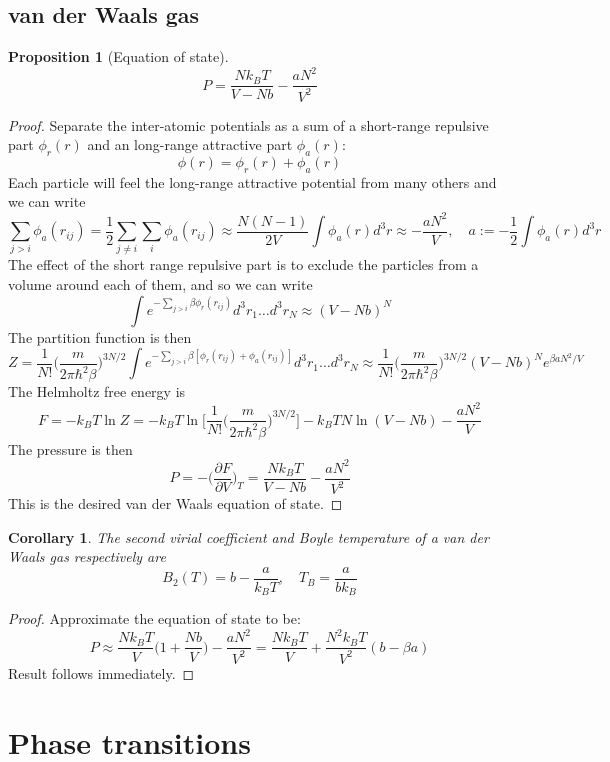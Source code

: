 \documentclass[a4paper]{article}
\theoremstyle{new}
\newtheorem{prop}{Proposition}[section]
\newtheorem{cor}{Corollary}[section]
\begin{document}
\subsection{van der Waals gas}
\begin{prop}[Equation of state]
$$P=\frac{Nk_BT}{V-Nb}-\frac{aN^2}{V^2}$$
\end{prop}
\begin{proof}
Separate the inter-atomic potentials as a sum of a short-range repulsive part $\phi_r(r)$ and an long-range attractive part $\phi_a(r)$:
$$\phi(r)=\phi_r(r)+\phi_a(r)$$
Each particle will feel the long-range attractive potential from many others and we can write
$$\sum_{j>i}\phi_a(r_{ij})=\frac{1}{2}\sum_{j\neq i}\sum_i\phi_a(r_{ij})\approx\frac{N(N-1)}{2V}\int\phi_a(r)d^3r\approx-\frac{aN^2}{V},\quad a:=-\frac{1}{2}\int\phi_a(r)d^3r$$
The effect of the short range repulsive part is to exclude the particles from a volume around each of them, and so we can write
$$\int e^{-\sum_{j>i}\beta\phi_r(r_{ij})}d^3r_1\dots d^3r_N\approx (V-Nb)^N$$
The partition function is then
$$Z=\frac{1}{N!}\bigg(\frac{m}{2\pi\hbar^2\beta}\bigg)^{3N/2}\int e^{-\sum_{j>i}\beta[\phi_r(r_{ij})+\phi_a(r_{ij})]}d^3r_1\dots d^3r_N\approx\frac{1}{N!}\bigg(\frac{m}{2\pi\hbar^2\beta}\bigg)^{3N/2}(V-Nb)^Ne^{\beta aN^2/V}$$
The Helmholtz free energy is
$$F=-k_BT\ln Z=-k_BT\ln\bigg[\frac{1}{N!}\bigg(\frac{m}{2\pi\hbar^2\beta}\bigg)^{3N/2}\bigg]-k_BTN\ln(V-Nb)-\frac{aN^2}{V}$$
The pressure is then
$$P=-\bigg(\frac{\partial F}{\partial V}\bigg)_T=\frac{Nk_BT}{V-Nb}-\frac{aN^2}{V^2}$$
This is the desired van der Waals equation of state.
\end{proof}
\begin{cor}
The second virial coefficient and Boyle temperature of a van der Waals gas respectively are
$$B_2(T)=b-\frac{a}{k_BT},\quad T_B=\frac{a}{bk_B}$$
\end{cor}
\begin{proof}
Approximate the equation of state to be:
$$P\approx\frac{Nk_BT}{V}\bigg(1+\frac{Nb}{V}\bigg)-\frac{aN^2}{V^2}=\frac{Nk_BT}{V}+\frac{N^2k_BT}{V^2}(b-\beta a)$$
Result follows immediately.
\end{proof}
\newpage
\section{Phase transitions}
\end{document}
